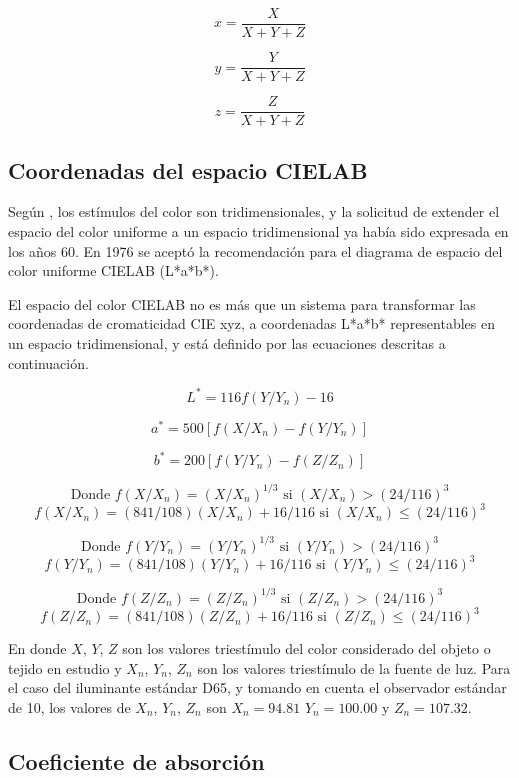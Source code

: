 		$$x = \frac{X}{X+Y+Z}$$
		
		$$y = \frac{Y}{X+Y+Z}$$
		
		$$z = \frac{Z}{X+Y+Z}$$

\newpage

	\subsection{Coordenadas del espacio CIELAB}
	
		Seg\'{u}n \cite{Schanda}, los est\'{i}mulos del color son tridimensionales, y la solicitud de extender el espacio del color uniforme a un espacio tridimensional ya hab\'{i}a sido expresada en los a\~{n}os 60. En 1976 se acept\'{o} la recomendaci\'{o}n para el diagrama de espacio del color uniforme CIELAB (L*a*b*).
		
		El espacio del color CIELAB no es m\'{a}s que un sistema para transformar las coordenadas de cromaticidad CIE xyz, a coordenadas L*a*b* representables en un espacio tridimensional, y est\'{a} definido por las ecuaciones descritas a continuaci\'{o}n.
		
		$$L^* = 116f(Y/Y_n) - 16$$
		
		$$a^* = 500[f(X/X_n) - f(Y/Y_n)]$$
		
		$$b^* = 200[f(Y/Y_n) - f(Z/Z_n)]$$
		
		$$\text{Donde } f(X/X_n) = (X/X_n)^{1/3} \text{ si } (X/X_n) > (24/116)^3$$
		$$f(X/X_n) = (841/108)(X/X_n) + 16/116 \text{ si } (X/X_n) \leq (24/116)^3$$
		
		$$\text{Donde } f(Y/Y_n) = (Y/Y_n)^{1/3} \text{ si } (Y/Y_n) > (24/116)^3$$
		$$f(Y/Y_n) = (841/108)(Y/Y_n) + 16/116 \text{ si } (Y/Y_n) \leq (24/116)^3$$
		
		$$\text{Donde } f(Z/Z_n) = (Z/Z_n)^{1/3} \text{ si } (Z/Z_n) > (24/116)^3$$
		$$f(Z/Z_n) = (841/108)(Z/Z_n) + 16/116 \text{ si } (Z/Z_n) \leq (24/116)^3$$
		
		En donde $X$, $Y$, $Z$ son los valores triest\'{i}mulo del color considerado del objeto o tejido en estudio y $X_n$, $Y_n$, $Z_n$ son los valores triest\'{i}mulo de la fuente de luz. Para el caso del iluminante est\'{a}ndar D65, y tomando en cuenta el observador est\'{a}ndar de 10\degree, los valores de $X_n$, $Y_n$, $Z_n$ son $X_n = 94.81$ $Y_n = 100.00$ y $Z_n = 107.32$.

	\subsection{Coeficiente de absorci\'{o}n}
	
